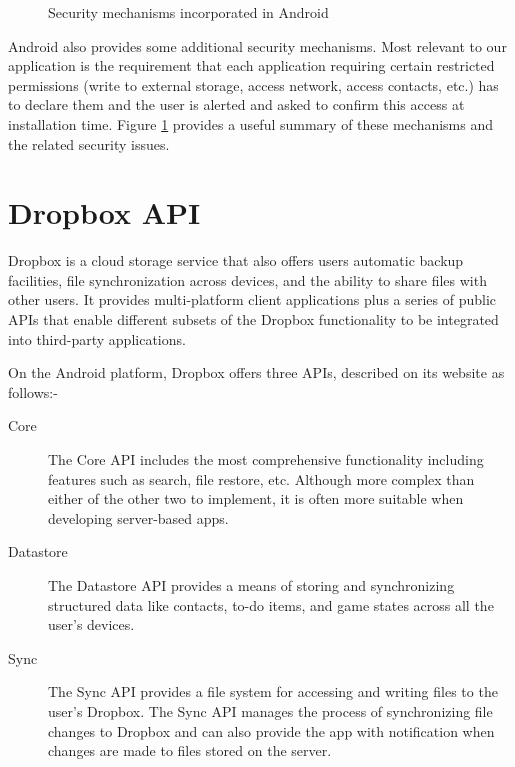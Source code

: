 \begin{figure}[h!]
                                                                                                                                                                                                                                                                                                                                                                                                                                           
\caption[Security table]{Security mechanisms incorporated in Android \citep{shabtai2010google}}\label{fg:overview_pyramid}
        \label{fig:table}
\end{figure}

Android also provides some additional security mechanisms. Most relevant to our application is the requirement that each application requiring certain restricted permissions (write to external storage, access network, access contacts, etc.) has to declare them and the user is alerted and asked to confirm this access at installation time.  Figure \ref{fig:table} provides a useful summary of these mechanisms and the related security issues.



\section{Dropbox API}
\label{sec:dropbox}
Dropbox is a cloud storage service that also offers users  automatic backup facilities, file synchronization across devices, and the ability to share files with other users.  It provides multi-platform client applications plus a series of public APIs that enable different subsets of the Dropbox functionality to be integrated into third-party applications.  

On the Android platform, Dropbox offers three APIs, described on its website as follows:-
\begin{description}
	\item[Core]The Core API includes the most comprehensive functionality including features such as search, file restore, etc. Although more complex than either of the other two to implement, it is often more suitable when developing server-based apps.
	\item[Datastore]The Datastore API provides a means of storing and synchronizing structured data like contacts, to-do items, and game states across  all the user's devices.
	\item[Sync]The Sync API provides a file system for accessing and writing files to the user's Dropbox.  The Sync API manages the process of synchronizing file changes to Dropbox and can also provide the app with notification when changes are made to files stored on the server.
\end{description}

